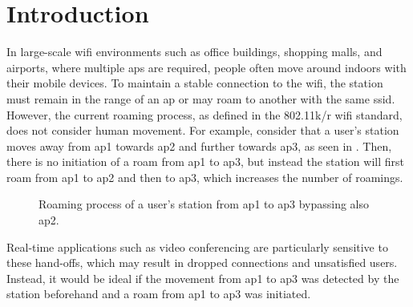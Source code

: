\chapter{Introduction}\label{ch:intro}

In large-scale \ac{wifi} environments such as office buildings, shopping malls, and airports, where multiple \acp{ap} are required, people often move around indoors with their mobile devices.
To maintain a stable connection to the \ac{wifi}, the station must remain in the range of an \ac{ap} or may roam to another with the same \ac{ssid}.
However, the current roaming process, as defined in the 802.11k/r\cite{802.11k}\cite{802.11r} \ac{wifi} standard, does not consider human movement.
For example, consider that a user's station moves away from \ac{ap}1 towards \ac{ap}2 and further towards \ac{ap}3, as seen in .
Then, there is no initiation of a roam from \ac{ap}1 to \ac{ap}3, but instead the station will first roam from \ac{ap}1 to \ac{ap}2 and then to \ac{ap}3, which increases the number of roamings.

\begin{figure}[h]
    \centering
    
    \caption{Roaming process of a user's station from \ac{ap}1 to \ac{ap}3 bypassing also \ac{ap}2.}
    \label{fig:roaming}
\end{figure}

Real-time applications such as video conferencing are particularly sensitive to these hand-offs, which may result in dropped connections and unsatisfied users.
Instead, it would be ideal if the movement from \ac{ap}1 to \ac{ap}3 was detected by the station beforehand and a roam from \ac{ap}1 to \ac{ap}3 was initiated.

